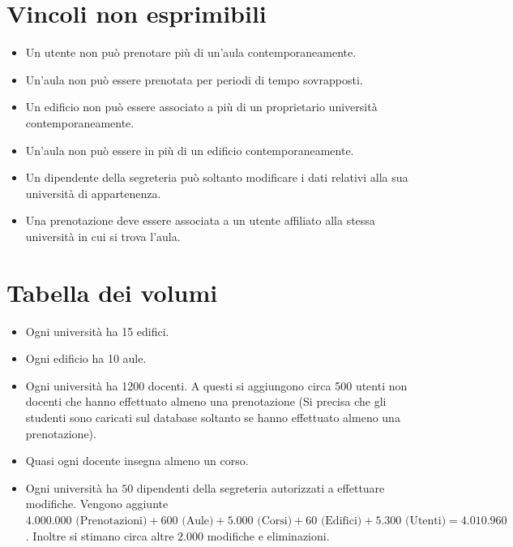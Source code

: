 \documentclass[a4paper, 10pt, oneside]{article} %
\begin{document}
\section{Vincoli non esprimibili}

\begin{itemize}
    \item Un utente non può prenotare più di un'aula contemporaneamente.
    \item Un'aula non può essere prenotata per periodi di tempo sovrapposti.
    \item Un edificio non può essere associato a più di un proprietario università contemporaneamente.
    \item Un'aula non può essere in più di un edificio contemporaneamente.
    \item Un dipendente della segreteria può soltanto modificare i dati relativi alla sua università di appartenenza.
    \item Una prenotazione deve essere associata a un utente affiliato alla stessa università in cui si trova l'aula.

\end{itemize}
\section{Tabella dei volumi}
\begin{itemize}
    \item Ogni università ha 15 edifici.
    \item Ogni edificio ha 10 aule.
    \item Ogni università ha 1200 docenti. A questi si aggiungono circa 500 utenti non docenti che hanno effettuato almeno una prenotazione (Si precisa che gli studenti sono caricati sul database soltanto se hanno effettuato almeno una prenotazione).
    \item Quasi ogni docente insegna almeno un corso.
    \item Ogni università ha $50$ dipendenti della segreteria autorizzati a effettuare modifiche. Vengono aggiunte $4.000.000 \mbox{ (Prenotazioni)}+600\mbox{ (Aule)}+5.000 \mbox{ (Corsi)}+ 60 \mbox{ (Edifici)} + 5.300 \mbox{ (Utenti)} = 4.010.960 $. Inoltre si stimano circa altre $2.000$ modifiche e eliminazioni. 
\end{itemize}
\end{document}
